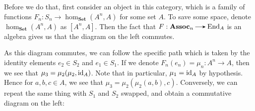 \begin{example}
    Before we do that, 
    first consider an object in this category, which 
    is a family of functions $F_n: S_n \to \hom_{\textbf{Set}}(A^n, A)$ 
    for some set $A$. To save some space, denote $\hom_{\textbf{Set}}(A^n, A)$ 
    as $[A^n, A]$.
    Then the fact that $F: \textbf{Assoc}_n \to \aend_A$ is an algebra gives us that 
    the diagram on the left commutes. 
    \begin{center}
    \end{center}
    As this diagram commutes, we can follow the specific path which is taken 
    by the identity elements $e_2 \in S_2$ and $e_1 \in S_1$. If we denote 
    $F_n(e_n) = \mu_n: A^n \to A$, then we see that $\mu_3 = \mu_2(\mu_2, \operatorname{\mathrm{id}}_A)$. 
    Note that in particular, $\mu_1 = \operatorname{\mathrm{id}}_A$ by hypothesis.
    Hence for $a, b, c \in A$, we see that $\mu_3 = \mu_2(\mu_2(a, b), c)$. 
    Conversely, we can repeat the same thing with $S_1$ and $S_2$ swapped, and 
    obtain a commutative diagram on the left:
    \begin{center}
\end{center}
\end{example}
